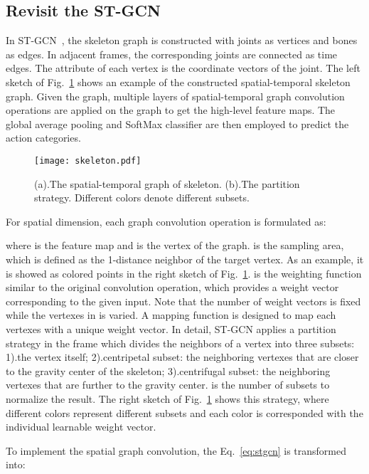 \documentclass[10pt,twocolumn,letterpaper]{article}
\begin{document}
	\subsection{Revisit the ST-GCN}
   	\label{gcn}
    In ST-GCN~\cite{yan_spatial_2018}, the skeleton graph is constructed with joints as vertices and bones as edges. In adjacent frames, the corresponding joints are connected as time edges. The attribute of each vertex is the coordinate vectors of the joint. The left sketch of Fig.~\ref{fig:skeleton} shows an example of the constructed spatial-temporal skeleton graph. Given the graph, multiple layers of spatial-temporal graph convolution operations are applied on the graph to get the high-level feature maps. The global average pooling and SoftMax classifier are then employed to predict the action categories.
    
    \begin{figure}[!htb]
	\centering
	\texttt{[image: skeleton.pdf]}
	\caption{(a).The spatial-temporal graph of skeleton. (b).The partition strategy. Different colors denote different subsets.}
	\label{fig:skeleton}
	\end{figure}

     For spatial dimension, each graph convolution operation is formulated as:

    where  is the feature map and  is the vertex of the graph.  is the sampling area, which is defined as the 1-distance neighbor of the target vertex. As an example, it is showed as colored points in the right sketch of Fig.~\ref{fig:skeleton}.  is the weighting function similar to the original convolution operation, which provides a weight vector corresponding to the given input. Note that the number of weight vectors is fixed while the vertexes in  is varied. A mapping function  is designed to map each vertexes with a unique weight vector. In detail, ST-GCN applies a partition strategy in the frame which divides the neighbors of a vertex into three subsets: 1).the vertex itself; 2).centripetal subset: the neighboring vertexes that are closer to the gravity center of the skeleton; 3).centrifugal subset: the neighboring vertexes that are further to the gravity center.  is the number of subsets to normalize the result. The right sketch of Fig.~\ref{fig:skeleton} shows this strategy, where different colors represent different subsets and each color is corresponded with the individual learnable weight vector.
    

    To implement the spatial graph convolution, the Eq.~\ref{eq:stgcn} is transformed into:
    
\end{document}
